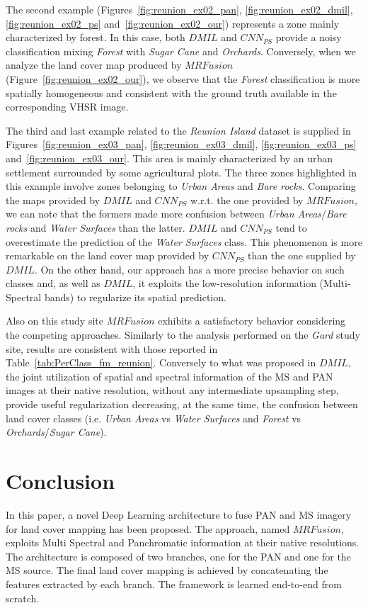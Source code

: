 \documentclass[journal]{IEEEtran}
\newcommand{\method}{$MRFusion$}
\begin{document}
The second example (Figures~\ref{fig:reunion_ex02_pan}, \ref{fig:reunion_ex02_dmil}, \ref{fig:reunion_ex02_ps} and~\ref{fig:reunion_ex02_our}) represents a zone mainly characterized by forest. In this case, both $DMIL$ and $CNN_{PS}$ provide a noisy classification mixing \textit{Forest} with \textit{Sugar Cane} and \textit{Orchards}.
Conversely, when we analyze the land cover map produced by \method{} (Figure~\ref{fig:reunion_ex02_our}), we observe that the \textit{Forest} classification is more spatially homogeneous and consistent with the ground truth available in the corresponding VHSR image.

The third and last example related to the \textit{Reunion Island} dataset is supplied in Figures~\ref{fig:reunion_ex03_pan}, \ref{fig:reunion_ex03_dmil}, \ref{fig:reunion_ex03_ps} and~\ref{fig:reunion_ex03_our}. This area is mainly characterized by an urban settlement surrounded by some agricultural plots. The three zones highlighted in this example involve zones belonging to \textit{Urban Areas} and \textit{Bare rocks}. Comparing the maps provided by $DMIL$ and $CNN_{PS}$ w.r.t. the one provided by \method{}, we can note that the formers made more confusion between \textit{Urban Areas}/\textit{Bare rocks} and \textit{Water Surfaces} than the latter.
$DMIL$ and $CNN_{PS}$ tend to overestimate the prediction of the \textit{Water Surfaces} class. This phenomenon is more remarkable on the land cover map provided by $CNN_{PS}$ than the one supplied by $DMIL$. On the other hand, our approach has a more precise behavior on such classes and, as well as $DMIL$, it exploits the low-resolution information (Multi-Spectral bands) to regularize its spatial prediction.

Also on this study site \method{} exhibits a satisfactory behavior considering the competing approaches. Similarly to the analysis performed on the \textit{Gard} study site, results are consistent with those reported in Table~\ref{tab:PerClass_fm_reunion}. Conversely to what was proposed in $DMIL$, the joint utilization of spatial and spectral information of the MS and PAN images at their native resolution, without any intermediate upsampling step, provide useful regularization decreasing, at the same time, the confusion between land cover classes (i.e. \textit{Urban Areas} vs \textit{Water Surfaces} and \textit{Forest} vs \textit{Orchards}/\textit{Sugar Cane}).

\section{Conclusion}
\label{sec:conclu}
In this paper, a novel Deep Learning architecture to fuse PAN and MS imagery for land cover mapping has been proposed. The approach, named \method{}, exploits Multi Spectral and Panchromatic information at their native resolutions. The architecture is composed of two branches, one for the PAN and one for the MS source. The final land cover mapping is achieved by concatenating the features extracted by each branch.%
The framework is learned end-to-end from scratch.
\end{document}
